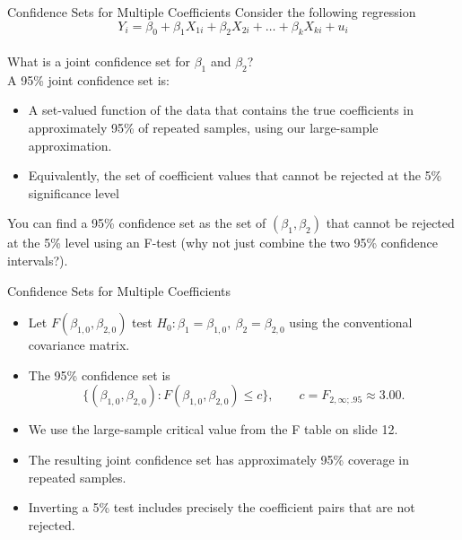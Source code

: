 \documentclass[notes,10pt, aspectratio=169]{beamer}
\begin{document}
\begin{frame}{Confidence Sets for Multiple Coefficients}
Consider the following regression
\begin{equation*}
    Y_i = \beta_0 + \beta_1 X_{1i} + \beta_2 X_{2i} + \dots  + \beta_k X_{ki} + u_i
\end{equation*}\\[1em]

What is a joint confidence set for $\beta_1$ and $\beta_2$?\\[1em]

A 95\% joint confidence set is:
\begin{itemize}
    \item A set-valued function of the data that contains the true coefficients in approximately 95\% of repeated samples, using our large-sample approximation.
    \item Equivalently, the set of coefficient values that cannot be rejected at the 5\% significance level
\end{itemize}

You can find a 95\% confidence set as the set of $(\beta_1, \beta_2)$ that cannot be rejected at the 5\% level using an F-test (why not just combine the two 95\% confidence intervals?).

\end{frame}


\begin{frame}{Confidence Sets for Multiple Coefficients}
\begin{itemize}
\item Let $F(\beta_{1,0},\beta_{2,0})$ test $H_0:\beta_1=\beta_{1,0},\ \beta_2=\beta_{2,0}$ using the conventional covariance matrix.\\[1em]
\item The 95\% confidence set is
\[\{(\beta_{1,0},\beta_{2,0}):F(\beta_{1,0},\beta_{2,0})\le c\},
\qquad c=F_{2,\infty;.95}\approx3.00.\]
\item We use the large-sample critical value from the F table on slide 12.\\[1em]
\item The resulting joint confidence set has approximately 95\% coverage in repeated samples.\\[1em]
\item Inverting a 5\% test includes precisely the coefficient pairs that are not rejected.
\end{itemize}
\end{frame}
\end{document}

